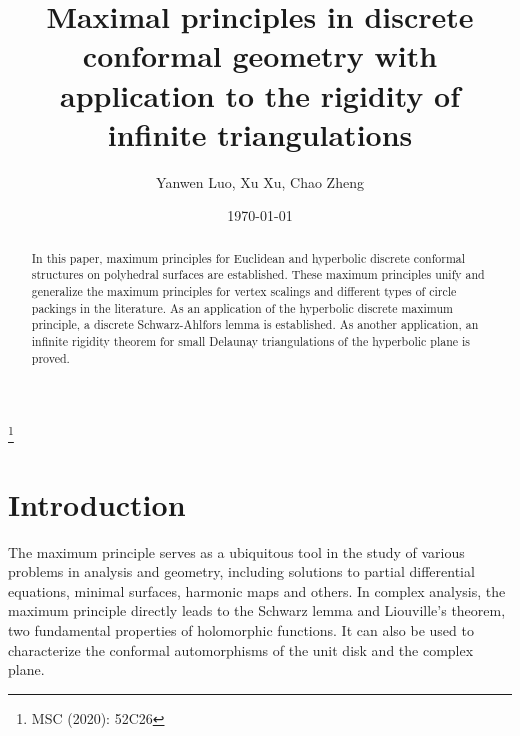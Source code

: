 \documentclass[12pt]{amsart}
\theoremstyle{definition}
\begin{document}


\title{\bf Maximal principles in discrete conformal geometry with application to the rigidity of infinite triangulations}
\author{Yanwen Luo, Xu Xu, Chao Zheng}

\date{\today}
\address{Department of Mathematics, Oklahoma State University, Stillwater, 74074, U.S.} 


\address{School of Mathematics and Statistics, Wuhan University, Wuhan, 430072, P.R.China} 

\address{School of Mathematics and Statistics, Wuhan University, Wuhan 430072, P.R. China} 

\thanks{MSC (2020): 52C26}

\keywords{}


\begin{abstract}
In this paper, maximum principles for Euclidean and hyperbolic discrete conformal structures on polyhedral surfaces are established.
These maximum principles unify and generalize the maximum principles for vertex scalings and different types of circle packings in the literature.
As an application of the hyperbolic discrete maximum principle, a discrete Schwarz-Ahlfors lemma is established.
As another application, an infinite rigidity theorem for small Delaunay triangulations of the hyperbolic plane is proved.
\end{abstract}

\maketitle

\tableofcontents

\section{Introduction}

The maximum principle serves as a ubiquitous tool in the study of various problems in analysis and geometry, including solutions to partial differential equations, minimal surfaces, harmonic maps and others.
In complex analysis, the maximum principle directly leads to the Schwarz lemma and Liouville's theorem,  two fundamental properties of holomorphic functions.
It can also be used to characterize the conformal automorphisms of the unit disk and the complex plane.
\end{document}
